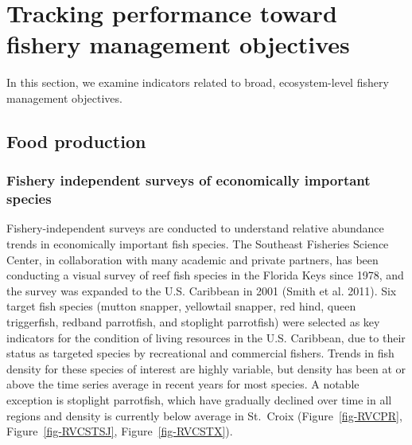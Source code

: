 \documentclass[
  letterpaper,
  oneside,
  open=any]{scrbook}
\begin{document}

\chapter{Tracking performance toward fishery management
objectives}\label{tracking-performance-toward-fishery-management-objectives}

In this section, we examine indicators related to broad, ecosystem-level
fishery management objectives.

\section{Food production}\label{food-production}

\subsection{Fishery independent surveys of economically important
species}\label{fishery-independent-surveys-of-economically-important-species}

Fishery-independent surveys are conducted to understand relative
abundance trends in economically important fish species. The Southeast
Fisheries Science Center, in collaboration with many academic and
private partners, has been conducting a visual survey of reef fish
species in the Florida Keys since 1978, and the survey was expanded to
the U.S. Caribbean in 2001 (Smith et al. 2011). Six target fish species
(mutton snapper, yellowtail snapper, red hind, queen triggerfish,
redband parrotfish, and stoplight parrotfish) were selected as key
indicators for the condition of living resources in the U.S. Caribbean,
due to their status as targeted species by recreational and commercial
fishers. Trends in fish density for these species of interest are highly
variable, but density has been at or above the time series average in
recent years for most species. A notable exception is stoplight
parrotfish, which have gradually declined over time in all regions and
density is currently below average in St.~Croix (Figure~\ref{fig-RVCPR},
Figure~\ref{fig-RVCSTSJ}, Figure~\ref{fig-RVCSTX}).
\end{document}
